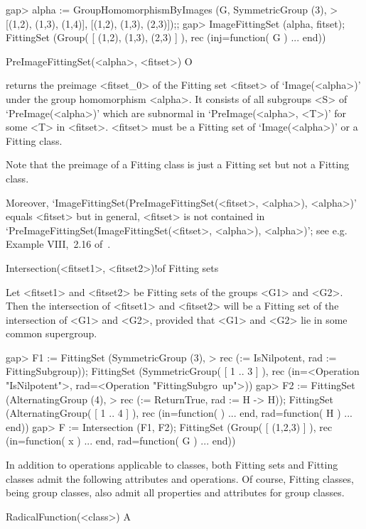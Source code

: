 \beginexample
gap> alpha := GroupHomomorphismByImages (G, SymmetricGroup (3),
>  [(1,2), (1,3), (1,4)], [(1,2), (1,3), (2,3)]);;
gap> ImageFittingSet (alpha, fitset);
FittingSet (Group( [ (1,2), (1,3), (2,3) ] ), rec (inj=function( G ) ... end))
\endexample

\>PreImageFittingSet(<alpha>, <fitset>) O

returns the preimage <fitset_0> of the Fitting set <fitset> of `Image(<alpha>)' under the group homomorphism <alpha>. It consists of all
subgroups <S> of `PreImage(<alpha>)' which are subnormal in `PreImage(<alpha>, <T>)' for some <T> in <fitset>. <fitset> must be a Fitting set of
`Image(<alpha>)' or a Fitting class. 

Note that the preimage of a Fitting class is just a Fitting set but 
not a Fitting class.

Moreover, `ImageFittingSet(PreImageFittingSet(<fitset>, <alpha>),
<alpha>)' equals <fitset> but in general, <fitset> is not contained in
`PreImageFittingSet(ImageFittingSet(<fitset>, <alpha>), <alpha>)'; see
e.g. Example VIII,~2.16 of~\cite{DH1992}.

\>Intersection(<fitset1>, <fitset2>)!{of Fitting sets}

Let <fitset1> and <fitset2> be Fitting sets of the groups <G1> and <G2>. 
Then the intersection of <fitset1> and <fitset2> will be a Fitting set of the 
intersection of <G1> and <G2>, provided that <G1> and <G2> lie in some 
common supergroup.

\beginexample
gap> F1 := FittingSet (SymmetricGroup (3),
> rec (\in := IsNilpotent, rad := FittingSubgroup));
FittingSet (SymmetricGroup( 
[ 1 .. 3 ] ), rec (in=<Operation "IsNilpotent">, rad=<Operation "FittingSubgro\
up">))
gap> F2 := FittingSet (AlternatingGroup (4),
> rec (\in := ReturnTrue, rad := H -> H));
FittingSet (AlternatingGroup( 
[ 1 .. 4 ] ), rec (in=function(  ) ... end, rad=function( H ) ... end))
gap> F := Intersection (F1, F2);
FittingSet (Group( 
[ (1,2,3) ] ), rec (in=function( x ) ... end, rad=function( G ) ... end))
\endexample


In addition to operations applicable to classes, both Fitting sets and
Fitting classes admit the following attributes and operations. Of course,
Fitting classes, being group classes, also admit all properties and
attributes for group classes.

\>RadicalFunction(<class>) A

